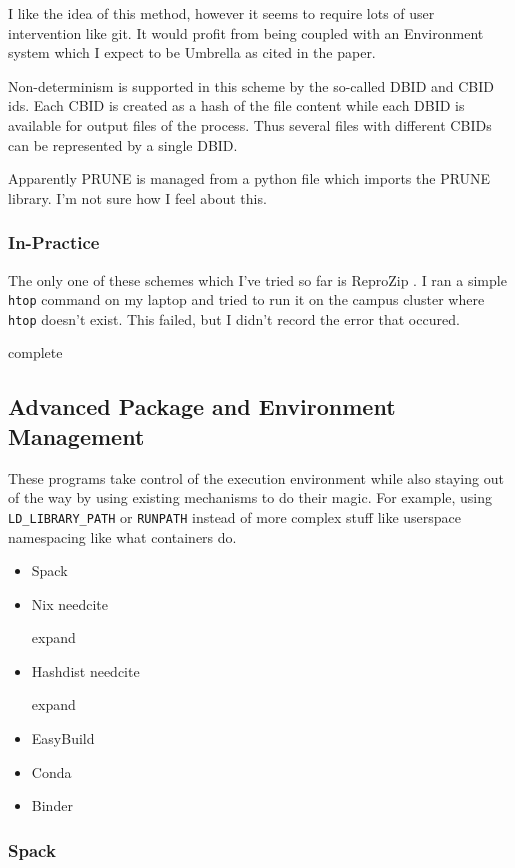 \documentclass[american]{article}
\newcommand{\complete}{
	\gls{complete}
}
\newcommand{\needcite}{
	\gls{needcite}
}
\newcommand{\expand}{
	\gls{expand}
}
\begin{document}
I like the idea of this method, however it seems to require lots of user intervention like git. It would profit from being coupled with an Environment system which I expect to be Umbrella as cited in the paper.

Non-determinism is supported in this scheme by the so-called DBID and CBID ids. Each CBID is created as a hash of the file content while each DBID is available for output files of the process. Thus several files with different CBIDs can be represented by a single DBID.

Apparently PRUNE is managed from a python file which imports the PRUNE library. I'm not sure how I feel about this.

\subsubsection{In-Practice} \label{sec:software-watchers-practice}

The only one of these schemes which I've tried so far is ReproZip \cite{reprozip}. I ran a simple \texttt{htop} command on my laptop and tried to run it on the campus cluster where \texttt{htop} doesn't exist. This failed, but I didn't record the error that occured.

\complete

\subsection{Advanced Package and Environment Management} \label{sec:software-advanced}

These programs take control of the execution environment while also staying out of the way by using existing mechanisms to do their magic. For example, using \texttt{LD\_LIBRARY\_PATH} or \texttt{RUNPATH} instead of more complex stuff like userspace namespacing like what containers do.

\begin{itemize}
\item Spack \cite{Spack}
\item Nix \needcite \expand
\item Hashdist \needcite \expand
\item EasyBuild \cite{EasyBuild}
\item Conda \cite{conda}
\item Binder \cite{binder}
\end{itemize}

\subsubsection{Spack} \label{sec:spack}
\end{document}
